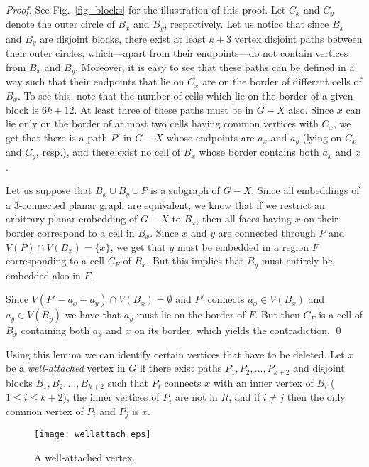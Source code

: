 \documentclass{llncs}
\begin{document}
\begin{proof}
See Fig.~\ref{fig_blocks} for the illustration of this proof.
Let $C_x$ and $C_y$ denote the outer circle of $B_x$ and $B_y$, respectively.
Let us notice that since $B_x$ and $B_y$ are disjoint blocks, there exist at least
$k+3$ vertex disjoint paths between their outer circles, which---apart from their endpoints---do
 not contain vertices from $B_x$ and $B_y$.
Moreover, it is easy to see that these paths can be defined in a way such that
their endpoints that lie on $C_x$ are on the border of different cells of $B_x$.
To see this, note that the number of cells which lie on the border of a given block is $6k+12$.
At least three of these paths must be in $G-X$ also.
Since $x$ can lie only on the border of at most two cells having common vertices with $C_x$, we
get that there is a path $P'$ in $G-X$ whose endpoints are $a_x$ and $a_y$
(lying on $C_x$ and $C_y$, resp.), and there exist no cell of $B_x$ whose border
contains both $a_x$ and $x$.

Let us suppose that $B_x \cup B_y \cup P$ is a subgraph of $G-X$.
Since all embeddings of a 3-connected planar graph are equivalent,
we know that if we restrict an
arbitrary planar embedding of $G-X$ to $B_x$, then all faces having $x$ on their border
correspond to a cell in $B_x$. Since $x$ and $y$ are connected through $P$
and $V(P) \cap V(B_x)= \{x\}$, we get that $y$ must be embedded in a region $F$ corresponding to a cell
$C_F$ of $B_x$. But this implies that $B_y$ must entirely be embedded also in $F$.

Since $V(P'-a_x-a_y) \cap V(B_x) =\emptyset$ and $P'$ connects $a_x \in V(B_x)$
and $a_y \in V(B_y)$ we have that $a_y$ must lie on the border of $F$.
But then $C_F$ is a cell of $B_x$ containing both $a_x$ and $x$ on its border,
which yields the contradiction.
\qed
\end{proof}

Using this lemma we can identify certain vertices that have to be deleted.
Let $x$ be a \emph{well-attached} vertex in $G$ if there exist
paths $P_1, P_2, \dots, P_{k+2}$ and disjoint blocks $B_1, B_2, \dots, B_{k+2}$ such that
$P_i$ connects $x$ with an inner vertex of $B_i$ ($1 \leq i \leq k+2$),
the inner vertices of $P_i$ are not in $R$,
and if $i \neq j$ then the only common vertex of $P_i$ and $P_j$ is $x$.

\begin{figure}[t]
\begin{center}
\texttt{[image: wellattach.eps]}
\end{center}
\caption{A well-attached vertex.}
\label{fig_wellattach}
\end{figure}
\end{document}
